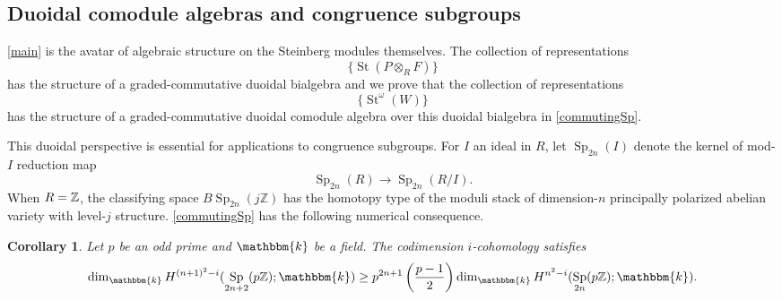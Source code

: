 \documentclass[11pt,letterpaper]{amsart}
\newcommand{\bk}{\mathbbm{k}}
\DeclareMathOperator{\Sp}{Sp}
\newcommand{\Z}{\mathbb{Z}}
\newcommand{\Q}{\mathbb{Q}}
\numberwithin{theoremcounter}{section}
\newtheorem{theorem}[theoremauto]{Theorem}
\newtheorem{corollary}[corollaryauto]{Corollary}
\theoremstyle{definition}
\theoremstyle{remark}
\DeclareMathOperator{\GL}{GL}
\DeclareMathOperator{\St}{St}
\begin{document}
\subsection{Duoidal comodule algebras and congruence subgroups}
\autoref{main} is the avatar of algebraic structure on the Steinberg modules themselves. The collection of representations $$\{\St(P \otimes_R F)\} $$ has the structure of a graded-commutative duoidal bialgebra and we prove that the collection of representations $$\{\St^\omega(W)\} $$ has the structure of a graded-commutative duoidal comodule algebra over this duoidal bialgebra in \autoref{commutingSp}. 


This duoidal perspective is essential for applications to congruence subgroups. For $I$ an ideal in $R$, let $\Sp_{2n}(I)$ denote the kernel of mod-$I$ reduction map $$\Sp_{2n}(R) \to \Sp_{2n}(R/I).$$ When $R=\mathbb{Z}$, the classifying space $B\Sp_{2n}(j\Z)$ has the homotopy type of the moduli stack of dimension-$n$ principally polarized abelian variety with level-$j$ structure. 
\autoref{commutingSp} has the following numerical consequence.








\begin{corollary} \label{CorCong} Let $p$ be an odd prime and $\bk$ be a field.
     The codimension $i$-cohomology satisfies $$\dim_\bk H^{(n+1)^2 -i}(\Sp_{2n+2}(p\Z);\bk) \geq p^{2n+1}\left(\frac{p-1}{2}\right) \dim_\bk H^{n^2 -i}(\Sp_{2n}(p\Z);\bk).$$ 
     
\end{corollary}
\end{document}
